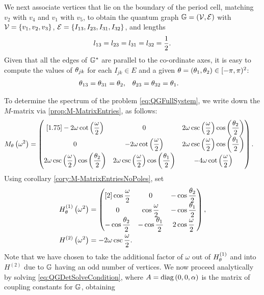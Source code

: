 We next associate vertices that lie on the boundary of the period cell, matching $v_2$ with $v_4$ and $v_1$ with $v_5$, to obtain the quantum graph $\mathbb{G}=\left( \mathcal{V},\mathcal{E} \right)$ with $\mathcal{V}=\left\{ v_1,v_2,v_3 \right\}$, $\mathcal{E}=\left\{ I_{13},I_{23},I_{31},I_{32} \right\}$, and lengths
\begin{align*}
	l_{13} = l_{23} = l_{31} = l_{32} = \frac{1}{2}.
\end{align*}
Given that all the edges of $\mathbb{G}^*$ are parallel to the co-ordinate axes, it is easy to compute the values of $\theta_{jk}$ for each $I_{jk}\in E$ and a given $\theta=\left( \theta_1,\theta_2 \right)\in[-\pi,\pi)^2$:
\begin{align*}
	\theta_{13} = \theta_{31} = \theta_2, &\quad \theta_{23} = \theta_{32} = \theta_1.
\end{align*}

To determine the spectrum of the problem \eqref{eq:QGFullSystem}, we write down the $M$-matrix via \ref{prop:M-MatrixEntries}, as follows: 
\begin{align*}
	M_{\theta}\left( \omega^2 \right) &=
	\begin{pmatrix}[1.75]
		-2\omega\cot\left( \dfrac{\omega}{2} \right) & 0 & 2\omega\csc\left( \dfrac{\omega}{2} \right)\cos\left( \dfrac{\theta_2}{2} \right) \\
		0 & -2\omega\cot\left( \dfrac{\omega}{2} \right) & 2\omega\csc\left( \dfrac{\omega}{2} \right)\cos\left( \dfrac{\theta_1}{2} \right) \\
		2\omega\csc\left( \dfrac{\omega}{2} \right)\cos\left( \dfrac{\theta_2}{2} \right) & 2\omega\csc\left( \dfrac{\omega}{2} \right)\cos\left( \dfrac{\theta_1}{2} \right) & -4\omega\cot\left( \dfrac{\omega}{2} \right)
	\end{pmatrix}.
\end{align*}
Using corollary \ref{cory:M-MatrixEntriesNoPoles}, set
\begin{align*}
	H_\theta^{(1)}\left( \omega^2 \right) &=
	\begin{pmatrix}[2]
		\cos\dfrac{\omega}{2} & 0 & -\cos\dfrac{\theta_2}{2} \\
		0 & \cos\dfrac{\omega}{2} & -\cos\dfrac{\theta_1}{2} \\
		-\cos\dfrac{\theta_2}{2} & -\cos\dfrac{\theta_1}{2} & 2\cos\dfrac{\omega}{2}
	\end{pmatrix}, \\
	H^{(2)}\left( \omega^2 \right) &= -2\omega\csc\frac{\omega}{2}.
\end{align*}
Note that we have chosen to take the additional factor of $\omega$ out of $H_\theta^{(1)}$ and into $H^{(2)}$ due to $\mathbb{G}$ having an odd number of vertices.
We now proceed analytically by solving \eqref{eq:QGDetSolveCondition}, where $A=\mathrm{diag}\left( 0,0,\alpha \right)$ is the matrix of coupling constants for $\mathbb{G}$, obtaining
